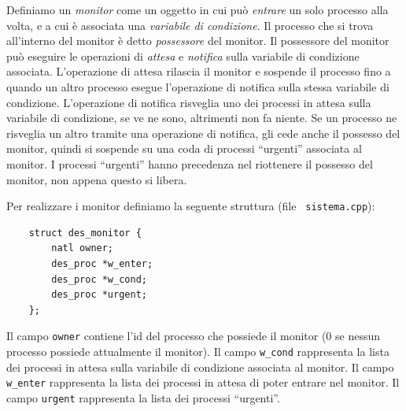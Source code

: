 Definiamo un {\em monitor} come un oggetto in cui pu\`o {\em entrare}
un solo processo alla volta, e a cui \`e associata una {\em
variabile di condizione}. 
Il processo che si trova all'interno del monitor \`e detto {\em possessore}
del monitor.
Il possessore del monitor pu\`o eseguire le
operazioni di {\em attesa} e {\em notifica} sulla variabile di condizione
associata. L'operazione di attesa rilascia il monitor e sospende il processo fino a quando un
altro processo esegue l'operazione di notifica sulla stessa variabile di
condizione. L'operazione di notifica risveglia uno dei processi in attesa
sulla variabile di condizione, se ve ne sono, altrimenti non fa niente.
Se un processo ne risveglia un altro tramite una operazione di notifica, gli
cede anche il possesso del monitor, quindi si sospende su una coda di processi
``urgenti'' associata al monitor. I processi ``urgenti'' hanno precedenza nel
riottenere il possesso del monitor, non appena questo si libera.

Per realizzare i monitor definiamo la seguente struttura (file {\tt
sistema.cpp}):

\begin{verbatim}
    struct des_monitor {
        natl owner;
        des_proc *w_enter;
        des_proc *w_cond;
        des_proc *urgent;
    };
\end{verbatim}

Il campo {\tt owner} contiene l'id del processo che possiede il monitor (0 se
nessun processo possiede attualmente il monitor).  
Il campo \verb|w_cond| rappresenta la lista dei processi in attesa
sulla variabile di condizione associata al monitor.
Il campo \verb|w_enter| rappresenta la lista dei processi in attesa
di poter entrare nel monitor. Il campo {\tt urgent} rappresenta
la lista dei processi ``urgenti''.

